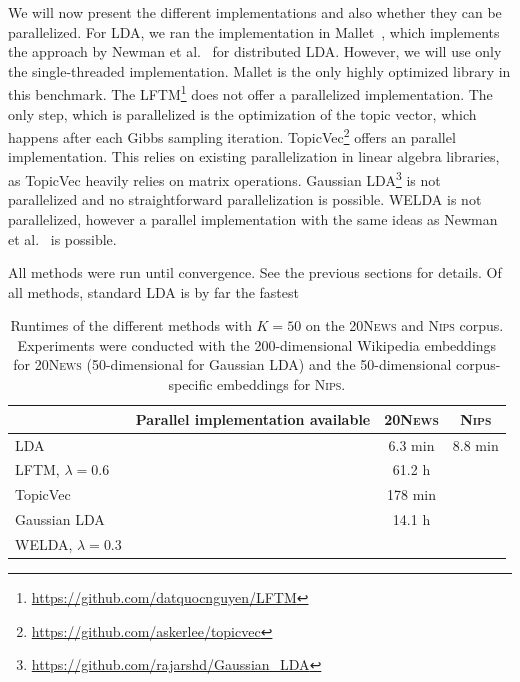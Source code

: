 \documentclass[
        a4paper,
        titlepage,
        twoside,
        parskip
        ]{scrbook}
\newcommand{\ra}[1]{\renewcommand{\arraystretch}{#1}}
\newcommand{\cmark}{\ding{51}}
\newcommand{\xmark}{\ding{55}}
\theoremstyle{break}
\begin{document}
We will now present the different implementations and also whether they can be parallelized.
For LDA, we ran the implementation in Mallet~\cite{McCallum2002}, which implements the approach by Newman et al.~\cite{Newman2009} for distributed LDA.
However, we will use only the single-threaded implementation.
Mallet is the only highly optimized library in this benchmark.
The LFTM\footnote{\url{https://github.com/datquocnguyen/LFTM}} does not offer a parallelized implementation.
The only step, which is parallelized is the optimization of the topic vector, which happens after each Gibbs sampling iteration.
TopicVec\footnote{\url{https://github.com/askerlee/topicvec}} offers an parallel implementation.
This relies on existing parallelization in linear algebra libraries, as TopicVec heavily relies on matrix operations.
Gaussian LDA\footnote{\url{https://github.com/rajarshd/Gaussian_LDA}} is not parallelized and no straightforward parallelization is possible.
WELDA is not parallelized, however a parallel implementation with the same ideas as Newman et al.~\cite{Newman2009} is possible.

All methods were run until convergence.
See the previous sections for details.
Of all methods, standard LDA is by far the fastest

\begin{table}[]
  \ra{1.2}
  \centering
  \caption{Runtimes of the different methods with $K = 50$ on the \textsc{20News} and \textsc{Nips} corpus.
  Experiments were conducted with the 200-dimensional Wikipedia embeddings for \textsc{20News} (50-dimensional for Gaussian LDA) and the 50-dimensional corpus-specific embeddings for \textsc{Nips}.
  }
  \label{table:runtime}
  \begin{tabular}{@{}lp{4cm}cc@{}}
    \toprule
                                        & Parallel implementation \newline available      & \textsc{20News} & \textsc{Nips}       \\ \midrule
                 LDA                    & ~~~~~~~~~~~~~~~~\cmark                                 & 6.3 min         & 8.8 min \\ %
                 LFTM, $\lambda = 0.6$  & ~~~~~~~~~~~~~~~~\xmark                                 & 61.2 h          & \\
                 TopicVec               & ~~~~~~~~~~~~~~~~\cmark                                 & 178 min         & \\
                 Gaussian LDA           & ~~~~~~~~~~~~~~~~\xmark                                 & 14.1 h          & \\ %
                 WELDA, $\lambda = 0.3$ & ~~~~~~~~~~~~~~~~\xmark                                 &                 & \\ \bottomrule %
  \end{tabular}
\end{table}
\end{document}
